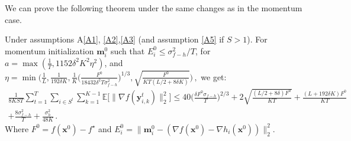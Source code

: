 \documentclass[10pt]{article} %
\theoremstyle{plain}
\theoremstyle{definition}
\theoremstyle{remark}
\newcommand{\norm}[1]{\|#1\|_2}
\def\vm{{\bm{m}}}
\def\vx{{\bm{x}}}
\def\vy{{\bm{y}}}
\newcommand{\E}{\mathbb{E}}
\begin{document}
We can prove the following theorem under the same changes as in the momentum case.

\begin{framedtheorem}
Under assumptions A\ref{A1}, \ref{A2},\ref{A3} (and assumption \ref{A5} if $S>1$). For momentum initialization $\vm_i^0$ such that $E_i^0\leq \sigma_{f-h}^2/T$, for $a =\max(\frac{1}{T}, 1152 \delta^2 K^2\eta^2)$,  and 
$\eta = \min\Big(\frac{1}{L},\frac{1}{192\delta K}, \frac{1}{K}\Big(\frac{F^0}{18432\delta^2T\sigma_{f-h}^2}\Big)^{1/3},\sqrt{\frac{F^0}{KT(L/2 + 8\delta K)}}\Big)\, ,$
we get:
\begin{multline*}
    \frac{1}{8KST}\sum_{t=1}^T\sum_{i\in S^t}\sum_{k=1}^{K-1} \E\big[\norm{\nabla f(\vy^t_{i,k})}^2\big] \leq  40 \Big(\frac{\delta F^0\sigma_{f-h}}{T}\Big)^{2/3} + 2\sqrt{\frac{(L/2 + 8\delta )F^0}{KT}} +  \frac{(L + 192 \delta K)F^0}{KT} \\ + \frac{8\sigma_{f-h}^2}{T} + \frac{\sigma_h^2}{48 K}\, .
\end{multline*}
Where $F^0 = f(\vx^0) - f^\star$ and $E_i^0 = \norm{\vm_i^0 - (\nabla f(\vx^0) - \nabla h_i(\vx^0))}^2$.
\end{framedtheorem}
\end{document}
